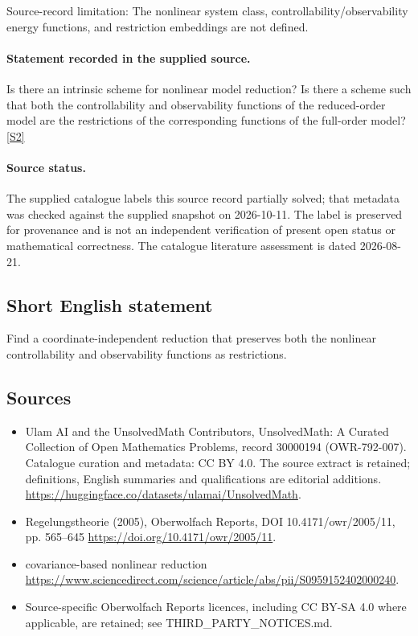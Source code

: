 \documentclass[11pt]{article}
\begin{document}
Source-record limitation: The nonlinear system class, controllability/observability energy functions, and restriction embeddings are not defined.
\paragraph{Statement recorded in the supplied source.}
Is there an intrinsic scheme for nonlinear model reduction? Is there a scheme such that both the controllability and observability functions of the reduced-order model are the restrictions of the corresponding functions of the full-order model? \href{https://doi.org/10.4171/owr/2005/11}{[S2]}
\paragraph{Source status.}
The supplied catalogue labels this source record partially solved; that metadata was checked against the supplied snapshot on 2026-10-11. The label is preserved for provenance and is not an independent verification of present open status or mathematical correctness. The catalogue literature assessment is dated 2026-08-21.
\subsection{Short English statement}
Find a coordinate-independent reduction that preserves both the nonlinear controllability and observability functions as restrictions.
\subsection{Sources}
\begin{itemize}
\item[S1] Ulam AI and the UnsolvedMath Contributors, UnsolvedMath: A Curated Collection of Open Mathematics Problems, record 30000194 (OWR-792-007). Catalogue curation and metadata: CC BY 4.0. The source extract is retained; definitions, English summaries and qualifications are editorial additions.
\url{https://huggingface.co/datasets/ulamai/UnsolvedMath}.
\item[S2] Regelungstheorie (2005), Oberwolfach Reports, DOI 10.4171/owr/2005/11, pp. 565--645
\url{https://doi.org/10.4171/owr/2005/11}.
\item[S3] covariance-based nonlinear reduction
\url{https://www.sciencedirect.com/science/article/abs/pii/S0959152402000240}.
\item Source-specific Oberwolfach Reports licences, including CC BY-SA 4.0 where applicable, are retained; see THIRD\_PARTY\_NOTICES.md.
\end{itemize}
\end{document}
